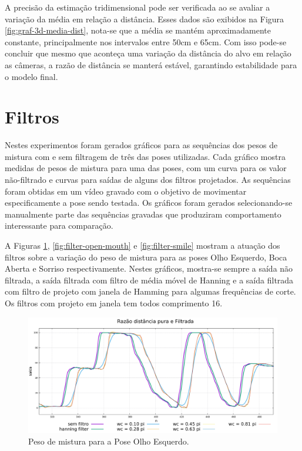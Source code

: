 A precisão da estimação tridimensional pode ser verificada ao se avaliar a
variação da média em relação a distância. Esses dados são exibidos na Figura
\ref{fig:graf-3d-media-dist}, nota-se que a média se mantém aproximadamente
constante, principalmente nos intervalos entre 50cm e 65cm. Com isso pode-se
concluir que mesmo que aconteça uma variação da distância do alvo em relação as
câmeras, a razão de distância se manterá estável, garantindo estabilidade para o
modelo final.

\section{Filtros}

Nestes experimentos foram gerados gráficos para as sequências dos pesos de
mistura com e sem filtragem de três das poses utilizadas. Cada gráfico mostra
medidas de pesos de mistura para uma das poses, com um curva para os valor
não-filtrado e curvas para saídas de alguns dos filtros projetados.  As
sequências foram obtidas em um vídeo gravado com o objetivo de movimentar
especificamente a pose sendo testada. Os gráficos foram gerados selecionando-se
manualmente parte das sequências gravadas que produziram comportamento
interessante para comparação.

A Figuras \ref{fig:filter-left-eye}, \ref{fig:filter-open-mouth} e
\ref{fig:filter-smile} mostram a atuação dos filtros sobre a variação do peso de
mistura para as poses Olho Esquerdo, Boca Aberta e Sorriso respectivamente.
Nestes gráficos, mostra-se sempre a saída não filtrada, a saída filtrada com
filtro de média móvel de Hanning e a saída filtrada com filtro de projeto com
janela de Hamming para algumas frequências de corte. Os filtros com projeto em
janela tem todos comprimento 16.

\begin{figure}[!htb]
\centering
\includegraphics[width=1.0\textwidth]{figs/filter-result-open-mouth.pdf} 
\caption{Peso de mistura para a Pose Olho Esquerdo.}
\label{fig:filter-left-eye}
\end{figure}

